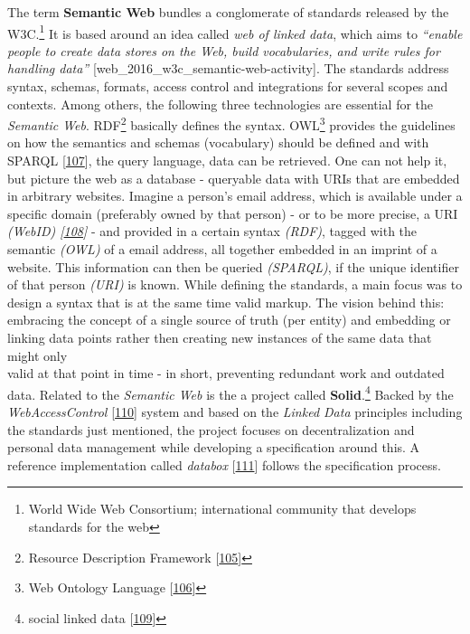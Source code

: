 \documentclass[12pt,english,a4paper,titlepage,cleardoublepage=empty,dottedtoc]{report}
\begin{document}
The term \textbf{\protect\hypertarget{def--semantic-web}{}{Semantic
Web}} bundles a conglomerate of standards released by the W3C.\footnote{World
  Wide Web Consortium; international community that develops standards
  for the web} It is based around an idea called \emph{web of linked
data}, which aims to \emph{``enable people to create data stores on the
Web, build vocabularies, and write rules for handling data''}
{[}web\_2016\_w3c\_semantic-web-activity{]}. The standards address
syntax, schemas, formats, access control and integrations for several
scopes and contexts. Among others, the following three technologies are
essential for the \emph{Semantic Web}. RDF\footnote{Resource Description
  Framework {[}\protect\hyperlink{ref-web_w3c-tr_rdf}{105}{]}} basically
defines the syntax. OWL\footnote{Web Ontology Language
  {[}\protect\hyperlink{ref-web_w3c-tr_owl}{106}{]}} provides the
guidelines on how the semantics and schemas (vocabulary) should be
defined and with \protect\hypertarget{def--sparql}{}{SPARQL}
{[}\protect\hyperlink{ref-web_w3c-tr_sparql}{107}{]}, the query
language, data can be retrieved. One can not help it, but picture the
web as a database - queryable data with URIs that are embedded in
arbitrary websites. Imagine a person's email address, which is available
under a specific domain (preferably owned by that person) - or to be
more precise, a URI \emph{(WebID)
{[}\protect\hyperlink{ref-web_w3c-draft_webid}{108}{]}} - and provided
in a certain syntax \emph{(RDF)}, tagged with the semantic \emph{(OWL)}
of a email address, all together embedded in an imprint of a website.
This information can then be queried \emph{(SPARQL)}, if the unique
identifier of that person \emph{(URI)} is known. While defining the
standards, a main focus was to design a syntax that is at the same time
valid markup. The vision behind this: embracing the concept of a single
source of truth (per entity) and embedding or linking data points rather
then creating new instances of the same data that might only\\
valid at that point in time - in short, preventing redundant work and
outdated data. Related to the \emph{Semantic Web} is the a project
called \textbf{Solid}.\footnote{social linked data
  {[}\protect\hyperlink{ref-web_spec_solid}{109}{]}} Backed by the
\emph{WebAccessControl}
{[}\protect\hyperlink{ref-web_2016_wiki_webaccesscontrol}{110}{]} system
and based on the \emph{Linked Data} principles including the standards
just mentioned, the project focuses on decentralization and personal
data management while developing a specification around this. A
reference implementation called \emph{databox}
{[}\protect\hyperlink{ref-web_2016_demo_databox}{111}{]} follows the
specification process.
\end{document}
